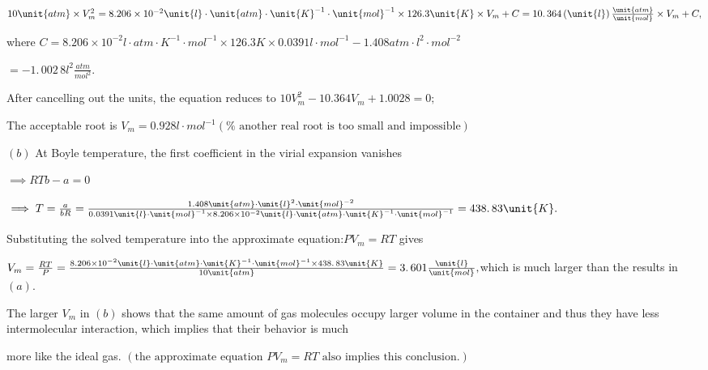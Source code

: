 \documentclass{article}
\begin{document}
$10\unit{atm}\times V_{m}^{2}=8.206\times 10^{-2}\unit{l}\cdot \unit{atm}%
\cdot \unit{K}^{-1}\cdot \unit{mol}^{-1}\times 126.3\unit{K}\times
V_{m}+C=\allowbreak 10.\,\allowbreak 364\left( \unit{l}\right) \frac{\unit{%
atm}}{\unit{mol}}\times V_{m}+C,$

where $C=8.206\times 10^{-2}\unit{l}\cdot \unit{atm}\cdot \unit{K}^{-1}\cdot 
\unit{mol}^{-1}\times 126.3\unit{K}\times 0.0391\unit{l}\cdot \unit{mol}%
^{-1}-1.408\unit{atm}\cdot \unit{l}^{2}\cdot \unit{mol}^{-2}$

$=-1.\,\allowbreak 002\,8\unit{l}^{2}\frac{\unit{atm}}{\unit{mol}^{2}}.$

After cancelling out the units, the equation reduces to $%
10V_{m}^{2}-10.364V_{m}+1.0028=0;$

The acceptable root is $V_{m}=0.928\unit{l}\cdot \unit{mol}^{-1}\left( \text{%
another real root is too small and impossible}\right) $

$\left( b\right) $ At Boyle temperature, the first coefficient in the virial
expansion vanishes

$\implies RTb-a=0$

$\implies T=\frac{a}{bR}=\frac{1.408\unit{atm}\cdot \unit{l}^{2}\cdot \unit{%
mol}^{-2}}{0.0391\unit{l}\cdot \unit{mol}^{-1}\times 8.206\times 10^{-2}%
\unit{l}\cdot \unit{atm}\cdot \unit{K}^{-1}\cdot \unit{mol}^{-1}}%
=\allowbreak 438.\,\allowbreak 83\unit{K}.$

Substituting the solved temperature into the approximate equation:$PV_{m}=RT$
gives

$V_{m}=\frac{RT}{P}=\frac{8.206\times 10^{-2}\unit{l}\cdot \unit{atm}\cdot 
\unit{K}^{-1}\cdot \unit{mol}^{-1}\times \allowbreak 438.\,\allowbreak 83%
\unit{K}}{10\unit{atm}}=\allowbreak 3.\,\allowbreak 601\frac{\unit{l}}{\unit{%
mol}},$which is much larger than the results in $\left( a\right) .$

The larger $V_{m}$ in $\left( b\right) $ shows that the same amount of gas
molecules occupy larger volume in the container and thus they have less
intermolecular interaction, which implies that their behavior is much

more like the ideal gas. $\left( \text{the approximate equation }PV_{m}=RT%
\text{ also implies this conclusion.}\right) $
\end{document}
